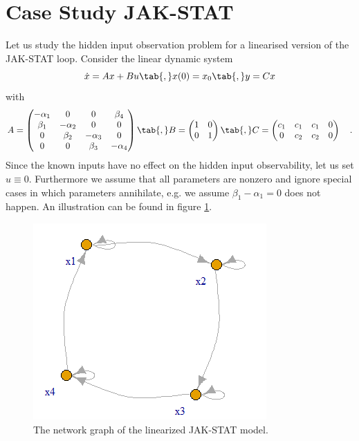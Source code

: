 \section{Case Study JAK-STAT}
Let us study the hidden input observation problem for a linearised version of the 
JAK-STAT loop. Consider the linear dynamic system
\begin{equation}
	\dot{x} = A x + B u \tab{,} x(0)=x_0 \tab{,} y = Cx
\end{equation}
with
\begin{equation}
	A = \begin{pmatrix}
	-\alpha_1 & 0 & 0 & \beta_4 \\ \beta_1 & -\alpha_2 & 0 & 0 \\
	0 & \beta_2 & -\alpha_3 & 0 \\ 0 & 0 & \beta_3 & -\alpha_4
	\end{pmatrix} \tab{,} 
	B = \begin{pmatrix}
	1 & 0 \\ 0 & 1
	\end{pmatrix} \tab{,}
	C = \begin{pmatrix}
	c_1 & c_1 & c_1 & 0 \\ 0 & c_2 & c_2 & 0
	\end{pmatrix} \quad .
\end{equation}
Since the known inputs have no effect on the hidden input observability, let us set 
$u \equiv 0$. Furthermore we assume that all parameters are nonzero and ignore special 
cases in which parameters annihilate, e.g. we assume $\beta_1-\alpha_1 = 0$ does not 
happen. An illustration can be found in figure \ref{fig:network_graph}.

\begin{figure}[h]
	\centering
	\includegraphics[scale=0.7]{bilder/JAKSTAT_network_graph.png}
	\caption{The network graph of the linearized JAK-STAT model.}
	\label{fig:network_graph}
\end{figure}

